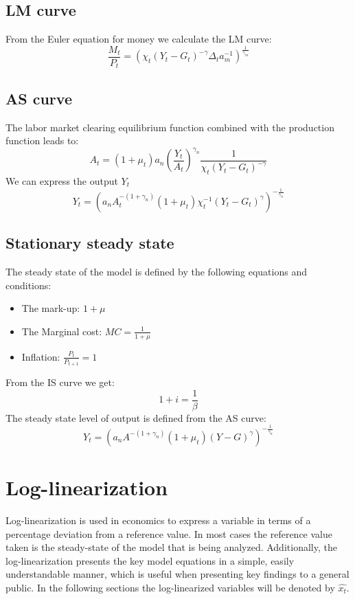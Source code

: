 \documentclass[10pt,a4paper]{article}
\begin{document}
\subsection{LM curve}
From the Euler equation for money we calculate the LM curve:
$$\frac{M_t}{P_t}=\left(
\chi_{t} (Y_t-G_t)^{-\gamma} \Delta_t a_m^{-1} \right)^{\frac{1}{\gamma_m}} $$
\subsection{AS curve}
The labor market clearing equilibrium function combined with the production function leads to:
\begin{equation*}
A_t= (1+\mu_t)a_n \left(\frac{Y_t}{A_t}\right)^{\gamma_n}\frac{1}{\chi_t (Y_t-G_t)^{-\gamma}}
\end{equation*}
We can express the output $Y_t$
\begin{equation}
Y_t=\left(
a_nA_t^{-(1+\gamma_n)}(1+\mu_t)\chi_t^{-1}(Y_t-G_t)^{\gamma}
\right)^{-\frac{1}{\gamma_n}}
\end{equation}
\subsection{Stationary steady state}
The steady state of the model is defined by the following equations and conditions:
\begin{itemize}
\item The mark-up: $1+\mu$
\item The Marginal cost: $MC=\frac{1}{1+\mu}$
\item Inflation: $\frac{P_t}{P_{t+1}}=1$
\end{itemize}
From the IS curve we get:
$$ 1+i=\frac{1}{\beta} $$
The steady state level of output is defined from the AS curve:
\begin{equation}\label{eq:48}
Y_t=\left(
a_nA^{-(1+\gamma_n)}(1+\mu_t)(Y-G)^{\gamma}
\right)^{-\frac{1}{\gamma_n}}
\end{equation}
\section{Log-linearization}
Log-linearization is used in economics to express a variable in terms of a percentage deviation from a reference value. In most cases the reference value taken is the steady-state of the model that is being analyzed. Additionally, the log-linearization presents the key model equations in a simple, easily understandable manner, which is useful when presenting key findings to a general public. In the following sections the log-linearized variables will be denoted by $\hat{x_t}$.
\end{document}
